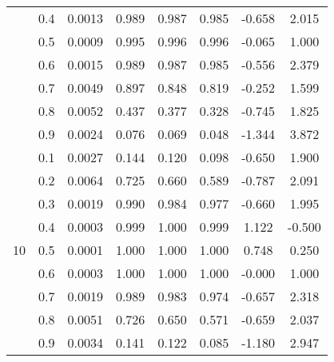 \documentclass[11pt,a4paper]{report}
\begin{document}
\begin{longtable}{ | c | c || c | c | c | c | c | c | }
 & 0.4 & 0.0013 & 0.989 & 0.987 & 0.985 & -0.658 & 2.015 \\
 & 0.5 & 0.0009 & 0.995 & 0.996 & 0.996 & -0.065 & 1.000 \\
 & 0.6 & 0.0015 & 0.989 & 0.987 & 0.985 & -0.556 & 2.379 \\
 & 0.7 & 0.0049 & 0.897 & 0.848 & 0.819 & -0.252 & 1.599 \\
 & 0.8 & 0.0052 & 0.437 & 0.377 & 0.328 & -0.745 & 1.825 \\
 & 0.9 & 0.0024 & 0.076 & 0.069 & 0.048 & -1.344 & 3.872 \\
 \hline
\multirow{9}{*}{10} & 0.1 & 0.0027 & 0.144 & 0.120 & 0.098 & -0.650 & 1.900 \\
 & 0.2 & 0.0064 & 0.725 & 0.660 & 0.589 & -0.787 & 2.091 \\
 & 0.3 & 0.0019 & 0.990 & 0.984 & 0.977 & -0.660 & 1.995 \\
 & 0.4 & 0.0003 & 0.999 & 1.000 & 0.999 & 1.122 & -0.500 \\
 & 0.5 & 0.0001 & 1.000 & 1.000 & 1.000 & 0.748 & 0.250 \\
 & 0.6 & 0.0003 & 1.000 & 1.000 & 1.000 & -0.000 & 1.000 \\
 & 0.7 & 0.0019 & 0.989 & 0.983 & 0.974 & -0.657 & 2.318 \\
 & 0.8 & 0.0051 & 0.726 & 0.650 & 0.571 & -0.659 & 2.037 \\
 & 0.9 & 0.0034 & 0.141 & 0.122 & 0.085 & -1.180 & 2.947 \\
 \hline
\hline
\end{longtable}
\end{document}
